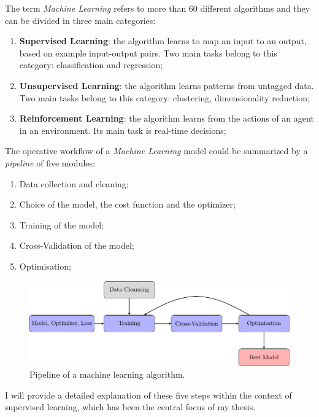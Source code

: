 The term \textit{Machine Learning} refers to more than 60 different algorithms and they can be divided in three main categories: 

\begin{enumerate}

\item \textbf{Supervised Learning}: the algorithm learns to map an input to an output,  based on example input-output pairs.
Two main tasks belong to this category: classification and regression;
\item \textbf{Unsupervised Learning}: the algorithm learns patterns from untagged data.
Two main tasks belong to this category: clustering, dimensionality reduction;
\item \textbf{Reinforcement Learning}: the algorithm learns from the actions of an agent in an environment.
Its main task is real-time decisions;

\end{enumerate}

The operative workflow of a \textit{Machine Learning} model could be summarized by a \textit{pipeline} of five modules:

\begin{enumerate}

\item Data collection and cleaning;
\item Choice of the model, the cost function and the optimizer;
\item Training of the model;
\item Cross-Validation of the model;
\item Optimisation;

\end{enumerate}

\begin{figure}[h]
\centering
\includegraphics[scale=0.8]{Chapters/Chapter2/flowchart.pdf}
\caption{Pipeline of a machine learning algorithm.}
\label{fig:pipeline}
\end{figure}

I will provide a detailed explanation of these five steps within the context of supervised learning, which has been the central focus of my thesis.

